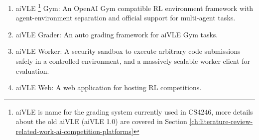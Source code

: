 \documentclass[fyp]{socreport}
\begin{document}
\begin{enumerate}
    \item aiVLE \footnote{aiVLE is name for the grading system currently used in CS4246, more details about the old aiVLE (aiVLE 1.0) are covered in Section \ref{ch:literature-review-related-work-ai-competition-platforms}} Gym: An OpenAI Gym \cite{openai-gym} compatible RL environment framework with agent-environment separation and official support for multi-agent tasks.
    \item aiVLE Grader: An auto grading framework for aiVLE Gym tasks.
    \item aiVLE Worker: A security sandbox to execute arbitrary code submissions safely in a controlled environment, and a massively scalable worker client for evaluation.
    \item aiVLE Web: A web application for hosting RL competitions.
\end{enumerate}
\end{document}
